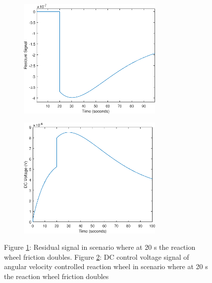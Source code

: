 \begin{figure}
	\centering
	\begin{subfigure}{.5\textwidth}
	\centering
	\includegraphics[width=70mm]{figures/residual_Noreconfig}
	\caption{}
	\label{fig:sub11}
	\end{subfigure}%
	\begin{subfigure}{.5\textwidth}
		\centering
		\includegraphics[width=70mm]{figures/voltage_Noreconfig}
		\caption{}
		\label{fig:sub12}
	\end{subfigure}
	\caption{Figure \ref{fig:sub11}: Residual signal in scenario where at 20 s the reaction wheel friction doubles. Figure \ref{fig:sub12}: DC control voltage signal of angular velocity controlled reaction wheel in scenario where at 20 s the reaction wheel friction doubles}
	\label{fig:residual}
\end{figure}


%

